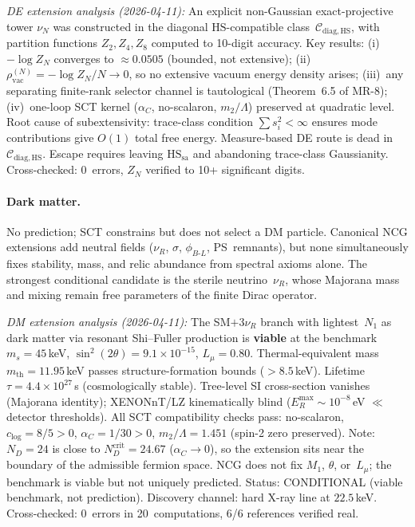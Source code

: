 \documentclass[12pt,a4paper]{article}
\begin{document}
\textit{DE extension analysis (2026-04-11):}  An explicit non-Gaussian
exact-projective tower $\nu_N$ was constructed in the diagonal
$\mathrm{HS}$-compatible class~$\mathcal{C}_{\mathrm{diag,HS}}$,
with partition functions $Z_2,Z_4,Z_8$ computed to 10-digit accuracy.
Key results: (i)~$-\log Z_N$ converges to $\approx 0.0505$ (bounded,
not extensive); (ii)~$\rho_{\mathrm{vac}}^{(N)}=-\log Z_N/N\to 0$,
so no extensive vacuum energy density arises; (iii)~any separating
finite-rank selector channel is tautological (Theorem~6.5 of MR-8);
(iv)~one-loop SCT kernel ($\alpha_C$, no-scalaron, $m_2/\Lambda$)
preserved at quadratic level.
Root cause of subextensivity: trace-class condition
$\sum s_i^2<\infty$ ensures mode contributions give $O(1)$
total free energy.
\textcolor{long}{Measure-based DE route is dead in
$\mathcal{C}_{\mathrm{diag,HS}}$.}  Escape requires leaving
$\mathrm{HS}_{\mathrm{sa}}$ and abandoning trace-class Gaussianity.
Cross-checked: 0~errors, $Z_N$ verified to 10+ significant digits.

\paragraph{Dark matter.}
\textcolor{long}{No prediction; SCT constrains but does not select a DM particle.}
Canonical NCG extensions add neutral fields
($\nu_R$, $\sigma$, $\phi_{B\text{-}L}$, PS~remnants), but none
simultaneously fixes stability, mass, and relic abundance from spectral
axioms alone.  The strongest conditional candidate is the sterile
neutrino~$\nu_R$, whose Majorana mass and mixing remain free parameters
of the finite Dirac operator.

\textit{DM extension analysis (2026-04-11):} The SM$+3\nu_R$ branch
with lightest~$N_1$ as dark matter via resonant Shi--Fuller production
is \textbf{viable} at the benchmark
$m_s = 45$\,keV, $\sin^2(2\theta) = 9.1 \times 10^{-15}$,
$L_\mu = 0.80$.  Thermal-equivalent mass $m_{\text{th}} = 11.95$\,keV
passes structure-formation bounds ($> 8.5$\,keV).  Lifetime
$\tau = 4.4 \times 10^{27}$\,s (cosmologically stable).
Tree-level SI cross-section vanishes (Majorana identity);
XENONnT/LZ kinematically blind ($E_R^{\max} \sim 10^{-8}$\,eV
$\ll$ detector thresholds).  All SCT compatibility checks pass:
no-scalaron, $c_{\log} = 8/5 > 0$, $\alpha_C = 1/30 > 0$,
$m_2/\Lambda = 1.451$ (spin-2 zero preserved).
Note: $N_D = 24$ is close to $N_D^{\text{crit}} = 24.67$
($\alpha_C \to 0$), so the extension sits near the boundary
of the admissible fermion space.
NCG does not fix $M_1$, $\theta$, or~$L_\mu$; the benchmark
is viable but not uniquely predicted.
\textcolor{near}{Status: CONDITIONAL (viable benchmark, not prediction).}
Discovery channel: hard X-ray line at $22.5$\,keV.
Cross-checked: 0~errors in 20~computations, 6/6 references verified real.
\end{document}
